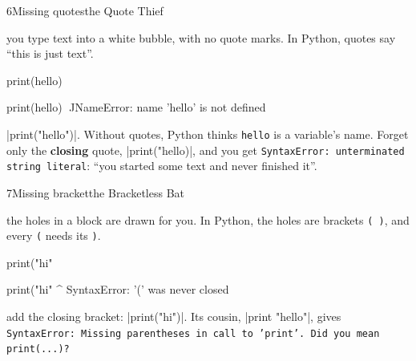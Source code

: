 \begin{bzcard}{6}{Missing quotes}{the Quote Thief}
\noindent\begin{minipage}[c]{0.43\linewidth}
 you type text into a white bubble, with no quote marks. In Python, quotes say ``this is just text''.
\end{minipage}\hfill
\begin{minipage}[c]{0.54\linewidth}
\begin{bzsnip}
print(hello)
\end{bzsnip}
\end{minipage}\par
\begin{bzerror}
    print(hello)
          ^^^^^
NameError: name 'hello' is not defined
\end{bzerror}
 \py|print("hello")|. Without quotes, Python thinks \texttt{hello} is a variable's name. Forget only the \textbf{closing} quote, \py|print("hello)|, and you get \texttt{SyntaxError: unterminated string literal}: ``you started some text and never finished it''.
\end{bzcard}

\begin{bzcard}{7}{Missing bracket}{the Bracketless Bat}
\noindent\begin{minipage}[c]{0.43\linewidth}
 the holes in a block are drawn for you. In Python, the holes are brackets \texttt{( )}, and every \texttt{(} needs its \texttt{)}.
\end{minipage}\hfill
\begin{minipage}[c]{0.54\linewidth}
\begin{bzsnip}
print("hi"
\end{bzsnip}
\end{minipage}\par
\begin{bzerror}
    print("hi"
         ^
SyntaxError: '(' was never closed
\end{bzerror}
 add the closing bracket: \py|print("hi")|. Its cousin, \py|print "hello"|, gives \texttt{SyntaxError: Missing parentheses in call to 'print'. Did you mean print(...)?}
\end{bzcard}

